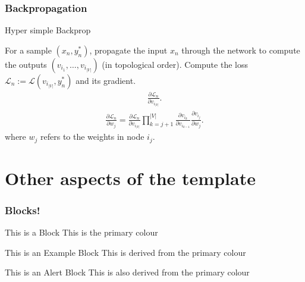 \documentclass[10pt, aspectratio = 169]{beamer} %
\begin{document}
\begin{frame}
	\frametitle{Backpropagation}
	\begin{algorithm}[H]
		\caption{Hyper simple Backprop}
		\begin{algorithmic}
			\small
			\State For a sample $(x_n ,y^*_n)$, propagate the input $x_n$ through the network to compute the outputs $(v_{i_1}, \ldots, v_{i_{|V|}})$ (in topological order).
			\vspace{0.2cm}
			\State Compute the loss $\mathcal{L}_n := \mathcal{L}(v_{i_{|V|}}, y_n^*)$ and its gradient.
			\begin{align}
				\frac{\partial \mathcal{L}_n}{\partial v_{i_{|V|}}}.
			\end{align}
				\begin{align}
					\frac{\partial \mathcal{L}_n}{\partial w_j} =
					\frac{\partial \mathcal{L}_n}{\partial v_{i_{|V|}}} \prod_{k = j + 1}^{|V|} \frac{\partial v_{i_k}}{\partial v_{i_{k - 1}}}
					\frac{\partial v_{i_j}}{\partial w_j}.
				\end{align}
				where $w_j$ refers to the weights in node $i_j$.
			\EndFor			
		\end{algorithmic}
	\end{algorithm}
\end{frame}

\section{Other aspects of the template}
\begin{frame}
    \frametitle{Blocks!}
    \begin{block}{This is a Block}
        This is the primary colour
    \end{block}
    \pause
    \begin{exampleblock}{This is an Example Block}
        This is derived from the primary colour
    \end{exampleblock}
    \pause
    \begin{alertblock}{This is an Alert Block}
        This is also derived from the primary colour
    \end{alertblock}
\end{frame}
\end{document}

